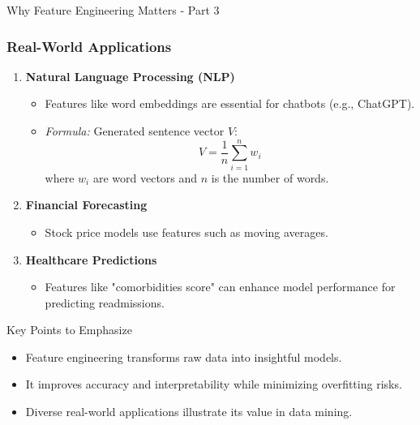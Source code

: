 \documentclass[aspectratio=169]{beamer}
\begin{document}
\begin{frame}[fragile]{Why Feature Engineering Matters - Part 3}
    \frametitle{Real-World Applications}
    
    \begin{enumerate}
        \item \textbf{Natural Language Processing (NLP)}
        \begin{itemize}
            \item Features like word embeddings are essential for chatbots (e.g., ChatGPT).
            \item \textit{Formula:} Generated sentence vector \( V \):
            \begin{equation}
            V = \frac{1}{n} \sum_{i=1}^{n} w_i
            \end{equation}
            where \( w_i \) are word vectors and \( n \) is the number of words.
        \end{itemize}
        
        \item \textbf{Financial Forecasting}
        \begin{itemize}
            \item Stock price models use features such as moving averages.
        \end{itemize}

        \item \textbf{Healthcare Predictions}
        \begin{itemize}
            \item Features like "comorbidities score" can enhance model performance for predicting readmissions.
        \end{itemize}
    \end{enumerate}

    \begin{block}{Key Points to Emphasize}
        \begin{itemize}
            \item Feature engineering transforms raw data into insightful models.
            \item It improves accuracy and interpretability while minimizing overfitting risks.
            \item Diverse real-world applications illustrate its value in data mining.
        \end{itemize}
    \end{block}
\end{frame}
\end{document}
